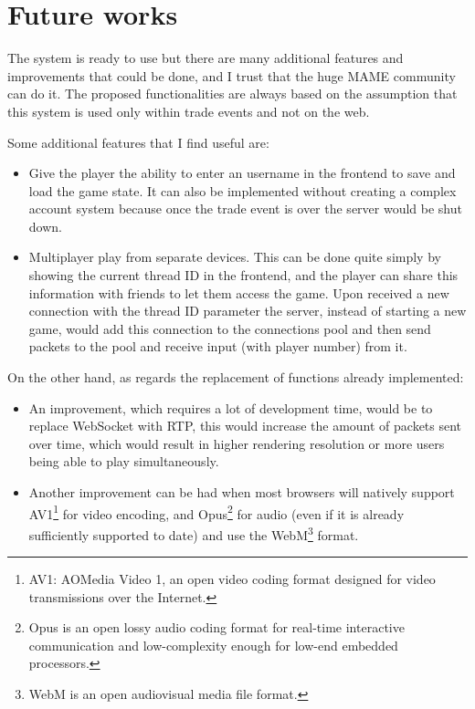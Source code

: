 \chapter{Future works}

The system is ready to use but there are many additional features and improvements that could be done, and I trust that the huge MAME community can do it. The proposed functionalities are always based on the assumption that this system is used only within trade events and not on the web.

Some additional features that I find useful are:
\begin{itemize}
	\item Give the player the ability to enter an username in the frontend to save and load the game state. It can also be implemented without creating a complex account system because once the trade event is over the server would be shut down.
	\item Multiplayer play from separate devices. This can be done quite simply by showing the current thread ID in the frontend, and the player can share this information with friends to let them access the game. Upon received a new connection with the thread ID parameter the server, instead of starting a new game, would add this connection to the connections pool and then send packets to the pool and receive input (with player number) from it.
\end{itemize}

On the other hand, as regards the replacement of functions already implemented:
\begin{itemize}
	\item An improvement, which requires a lot of development time, would be to replace WebSocket with RTP, this would increase the amount of packets sent over time, which would result in higher rendering resolution or more users being able to play simultaneously.
	\item Another improvement can be had when most browsers will natively support AV1\footnote{AV1: AOMedia Video 1, an open video coding format designed for video transmissions over the Internet.} for video encoding, and Opus\footnote{Opus is an open lossy audio coding format for real-time interactive communication and low-complexity enough for low-end embedded processors.} for audio (even if it is already sufficiently supported to date) and use the WebM\footnote{WebM is an open audiovisual media file format.} format.
\end{itemize}